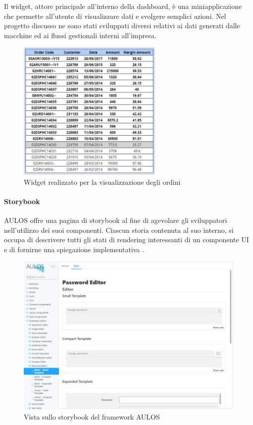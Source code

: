 \pagebreak
Il widget, attore principale all'interno della dashboard,
è una miniapplicazione che permette all'utente di visualizzare dati e svolgere semplici azioni. Nel progetto discusso ne sono stati sviluppati diversi relativi ai dati generati dalle macchine ed ai flussi gestionali interni all'impresa.
\begin{figure}[h]
\begin{center}
  \includegraphics[width=7cm]{images/orders_widget.jpg}
  \caption{Widget realizzato per la visualizzazione degli ordini}
\end{center}
\end{figure}
\paragraph{Storybook}
AULOS offre una pagina di storybook al fine di agevolare gli sviluppatori nell'utilizzo dei suoi componenti. Ciascun storia contenuta al suo interno, si occupa di descrivere tutti gli stati di rendering interessanti di un componente UI e di fornirne una spiegazione implementativa \cite{STORYBOOK}.
\pagebreak
\begin{figure}[h]
\begin{center}
  \includegraphics[width=14cm]{images/aulos_storybook.JPG}
  \caption{Vista sullo storybook del framework AULOS}
\end{center}
\end{figure}

